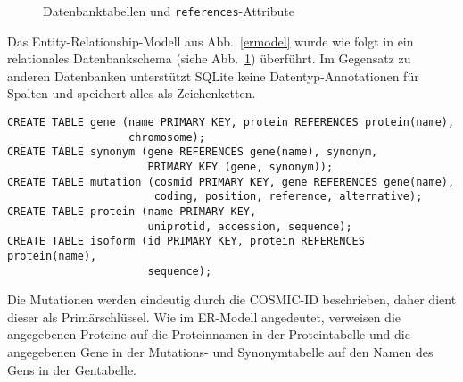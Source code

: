 \documentclass{scrartcl}
\begin{document}
\begin{figure}\centering
	\caption{Datenbanktabellen und \texttt{references}-Attribute}\label{tables}
\end{figure}

Das Entity-Relationship-Modell aus Abb.~\ref{ermodel} wurde wie folgt in ein relationales Datenbankschema (siehe Abb.~\ref{tables}) überführt. Im Gegensatz zu anderen Datenbanken unterstützt SQLite keine Datentyp-Annotationen für Spalten und speichert alles als Zeichenketten.
\begin{verbatim}
CREATE TABLE gene (name PRIMARY KEY, protein REFERENCES protein(name),
                   chromosome);
CREATE TABLE synonym (gene REFERENCES gene(name), synonym,
                      PRIMARY KEY (gene, synonym));
CREATE TABLE mutation (cosmid PRIMARY KEY, gene REFERENCES gene(name),
                       coding, position, reference, alternative);
CREATE TABLE protein (name PRIMARY KEY,
                      uniprotid, accession, sequence);
CREATE TABLE isoform (id PRIMARY KEY, protein REFERENCES protein(name),
                      sequence);
\end{verbatim}
Die Mutationen werden eindeutig durch die COSMIC-ID beschrieben, daher dient dieser als Primärschlüssel. Wie im ER-Modell angedeutet, verweisen die angegebenen Proteine auf die Proteinnamen in der Proteintabelle und die angegebenen Gene in der Mutations- und Synonymtabelle auf den Namen des Gens in der Gentabelle. 
\end{document}

